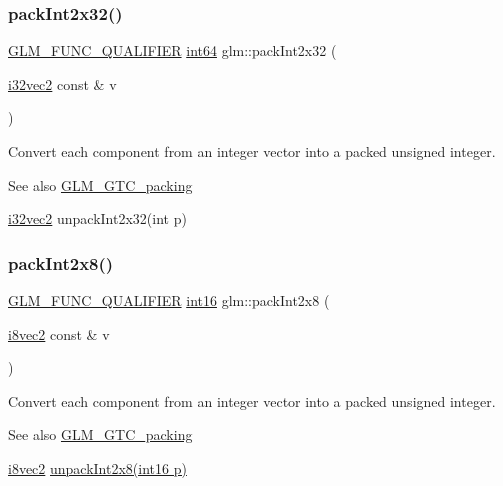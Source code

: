 \subsubsection{\texorpdfstring{pack\+Int2x32()}{packInt2x32()}}
{\footnotesize\ttfamily \hyperlink{setup_8hpp_a33fdea6f91c5f834105f7415e2a64407}{G\+L\+M\+\_\+\+F\+U\+N\+C\+\_\+\+Q\+U\+A\+L\+I\+F\+I\+ER} \hyperlink{group__gtc__type__precision_ga435d75819cce297cc5fa21bd84ef89a5}{int64} glm\+::pack\+Int2x32 (\begin{DoxyParamCaption}\item[{\hyperlink{group__gtc__type__precision_ga99191e0de942ecc1df32d522f8064789}{i32vec2} const \&}]{v }\end{DoxyParamCaption})}

Convert each component from an integer vector into a packed unsigned integer.

\begin{DoxySeeAlso}{See also}
\hyperlink{group__gtc__packing}{G\+L\+M\+\_\+\+G\+T\+C\+\_\+packing} 

\hyperlink{group__gtc__type__precision_ga99191e0de942ecc1df32d522f8064789}{i32vec2} unpack\+Int2x32(int p) 
\end{DoxySeeAlso}
\mbox{\label{group__gtc__packing_ga532b06d8915c6c65649f828e9106a1d9}} 
\subsubsection{\texorpdfstring{pack\+Int2x8()}{packInt2x8()}}
{\footnotesize\ttfamily \hyperlink{setup_8hpp_a33fdea6f91c5f834105f7415e2a64407}{G\+L\+M\+\_\+\+F\+U\+N\+C\+\_\+\+Q\+U\+A\+L\+I\+F\+I\+ER} \hyperlink{group__gtc__type__precision_ga2945a61d12771f8954994fcddf02b021}{int16} glm\+::pack\+Int2x8 (\begin{DoxyParamCaption}\item[{\hyperlink{group__gtc__type__precision_gade57e4b55fe2b2345a4f2ac2b149cd32}{i8vec2} const \&}]{v }\end{DoxyParamCaption})}

Convert each component from an integer vector into a packed unsigned integer.

\begin{DoxySeeAlso}{See also}
\hyperlink{group__gtc__packing}{G\+L\+M\+\_\+\+G\+T\+C\+\_\+packing} 

\hyperlink{group__gtc__type__precision_gade57e4b55fe2b2345a4f2ac2b149cd32}{i8vec2} \hyperlink{group__gtc__packing_ga55b4670bffab6ddb39d4a0fbf98718c1}{unpack\+Int2x8(int16 p)} 
\end{DoxySeeAlso}
\mbox{\label{group__gtc__packing_gac3ef78d62735b5c34503c33e37e401c2}} 
